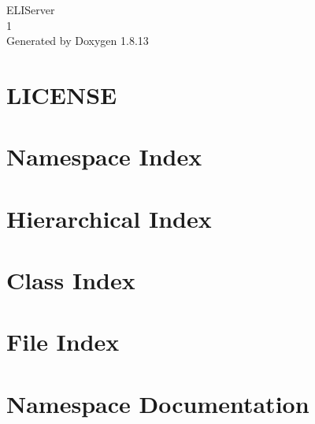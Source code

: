 \documentclass[twoside]{book}
\newcommand{\+}{\discretionary{\mbox{\scriptsize$\hookleftarrow$}}{}{}}
\newcommand{\clearemptydoublepage}{%
  \newpage{\pagestyle{empty}\cleardoublepage}%
}
\begin{document}
\hypersetup{pageanchor=false,
             bookmarksnumbered=true,
             pdfencoding=unicode
            }
\begin{titlepage}
\vspace*{7cm}
\begin{center}%
{\Large E\+L\+I\+Server \\[1ex]\large 1 }\\
\vspace*{1cm}
{\large Generated by Doxygen 1.8.13}\\
\end{center}
\end{titlepage}
\clearemptydoublepage
{}
\tableofcontents
\clearemptydoublepage
{}
\hypersetup{pageanchor=true}

\chapter{L\+I\+C\+E\+N\+SE}
\label{md_packages__newtonsoft_8_json_810_80_82__l_i_c_e_n_s_e}

\chapter{Namespace Index}

\chapter{Hierarchical Index}

\chapter{Class Index}

\chapter{File Index}

\chapter{Namespace Documentation}













\end{document}
